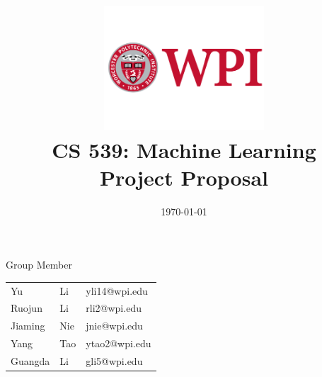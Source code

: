 \documentclass[11pt, a4paper]{article}
\title{\includegraphics[width=0.45\textwidth]{wpi2}
        \\CS 539: Machine Learning \\ 
    Project Proposal }          %
\author{}                                    %
\date{\today}
\begin{document}
\begin{titlepage}
\maketitle
{} %

\begin{center}
	Group Member
\end{center}

\begin{table}[htbp] 
	\begin{center}
		\begin{tabular}{l l l} 
			
			Yu & Li  &   yli14@wpi.edu \\
			Ruojun & Li  &   rli2@wpi.edu \\
			Jiaming & Nie  &  jnie@wpi.edu \\
			Yang & Tao   &  ytao2@wpi.edu \\
			Guangda & Li &    gli5@wpi.edu    \\
		\end{tabular}
	\end{center}
\end{table}


 
 





\thispagestyle{empty}  %

\end{titlepage}
\end{document}
